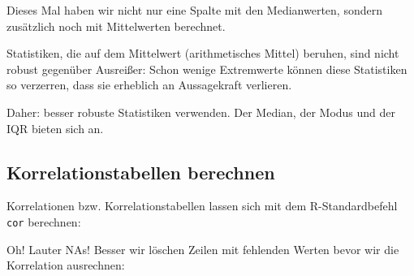 \documentclass[12pt,ngerman,]{book}
\makeatletter
\newenvironment{Shaded}{\begin{snugshade}}{\end{snugshade}}
\newcommand{\KeywordTok}[1]{\textcolor[rgb]{0.13,0.29,0.53}{\textbf{{#1}}}}
\newcommand{\StringTok}[1]{\textcolor[rgb]{0.31,0.60,0.02}{{#1}}}
\newcommand{\CommentTok}[1]{\textcolor[rgb]{0.56,0.35,0.01}{\textit{{#1}}}}
\newcommand{\NormalTok}[1]{{#1}}
\newenvironment{kframe}{%
\medskip{}
\setlength{\fboxsep}{.8em}
 \def\at@end@of@kframe{}%
 \ifinner\ifhmode%
  \def\at@end@of@kframe{\end{minipage}}%
  \begin{minipage}{\columnwidth}%
 \fi\fi%
 \def\FrameCommand##1{\hskip\@totalleftmargin \hskip-\fboxsep
 \colorbox{shadecolor}{##1}\hskip-\fboxsep
     \hskip-\linewidth \hskip-\@totalleftmargin \hskip\columnwidth}%
 \MakeFramed {\advance\hsize-\width
   \@totalleftmargin\z@ \linewidth\hsize
   \@setminipage}}%
 {\par\unskip\endMakeFramed%
 \at@end@of@kframe}
\renewenvironment{Shaded}{\begin{kframe}}{\end{kframe}}
\theoremstyle{definition}
\theoremstyle{definition}
\theoremstyle{remark}
\let\BeginKnitrBlock\begin \let\EndKnitrBlock\end
\makeatother
\begin{document}
Dieses Mal haben wir nicht nur eine Spalte mit den Medianwerten, sondern
zusätzlich noch mit Mittelwerten berechnet.

\BeginKnitrBlock{rmdcaution}
Statistiken, die auf dem Mittelwert (arithmetisches Mittel) beruhen,
sind nicht robust gegenüber Ausreißer: Schon wenige Extremwerte können
diese Statistiken so verzerren, dass sie erheblich an Aussagekraft
verlieren.

Daher: besser robuste Statistiken verwenden. Der Median, der Modus und
der IQR bieten sich an.
\EndKnitrBlock{rmdcaution}

\subsection{Korrelationstabellen
berechnen}\label{korrelationstabellen-berechnen}

Korrelationen bzw. Korrelationstabellen lassen sich mit dem
R-Standardbefehl \texttt{cor} berechnen:

\begin{Shaded}
\end{Shaded}

Oh! Lauter NAs! Besser wir löschen Zeilen mit fehlenden Werten bevor wir
die Korrelation ausrechnen:

\begin{Shaded}
\end{Shaded}
\end{document}
